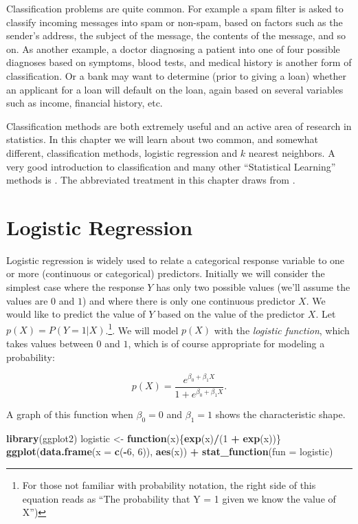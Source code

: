 \documentclass[
]{krantz}
\makeatletter
\newenvironment{Shaded}{\begin{snugshade}}{\end{snugshade}}
\newcommand{\ControlFlowTok}[1]{\textcolor[rgb]{0.27,0.27,0.27}{\textbf{#1}}}
\newcommand{\DataTypeTok}[1]{\textcolor[rgb]{0.27,0.27,0.27}{#1}}
\newcommand{\DecValTok}[1]{\textcolor[rgb]{0.06,0.06,0.06}{#1}}
\newcommand{\KeywordTok}[1]{\textcolor[rgb]{0.27,0.27,0.27}{\textbf{#1}}}
\newcommand{\NormalTok}[1]{#1}
\newcommand{\OperatorTok}[1]{\textcolor[rgb]{0.43,0.43,0.43}{\textbf{#1}}}
\newcommand{\StringTok}[1]{\textcolor[rgb]{0.5,0.5,0.5}{#1}}
\newenvironment{kframe}{%
\medskip{}
\setlength{\fboxsep}{.8em}
 \def\at@end@of@kframe{}%
 \ifinner\ifhmode%
  \def\at@end@of@kframe{\end{minipage}}%
  \begin{minipage}{\columnwidth}%
 \fi\fi%
 \def\FrameCommand##1{\hskip\@totalleftmargin \hskip-\fboxsep
 \colorbox{shadecolor}{##1}\hskip-\fboxsep
     \hskip-\linewidth \hskip-\@totalleftmargin \hskip\columnwidth}%
 \MakeFramed {\advance\hsize-\width
   \@totalleftmargin\z@ \linewidth\hsize
   \@setminipage}}%
 {\par\unskip\endMakeFramed%
 \at@end@of@kframe}
\renewenvironment{Shaded}{\begin{kframe}}{\end{kframe}}
\makeatother
\begin{document}
Classification problems are quite common. For example a spam filter is asked to classify incoming messages into spam or non-spam, based on factors such as the sender's address, the subject of the message, the contents of the message, and so on. As another example, a doctor diagnosing a patient into one of four possible diagnoses based on symptoms, blood tests, and medical history is another form of classification. Or a bank may want to determine (prior to giving a loan) whether an applicant for a loan will default on the loan, again based on several variables such as income, financial history, etc.

Classification methods are both extremely useful and an active area of research in statistics. In this chapter we will learn about two common, and somewhat different, classification methods, logistic regression and \(k\) nearest neighbors. A very good introduction to classification and many other ``Statistical Learning'' methods is \citet{JamesEtAl}. The abbreviated treatment in this chapter draws from \citet{JamesEtAl}.

\hypertarget{logistic-regression}{%
\section{Logistic Regression}\label{logistic-regression}}

Logistic regression is widely used to relate a categorical response variable to one or more (continuous or categorical) predictors. Initially we will consider the simplest case where the response \(Y\) has only two possible values (we'll assume the values are \(0\) and \(1\)) and where there is only one continuous predictor \(X\). We would like to predict the value of \(Y\) based on the value of the predictor \(X\). Let \(p(X) = P(Y = 1 | X)\).\footnote{For those not familiar with probability notation, the right side of this equation reads as ``The probability that Y = 1 given we know the value of X'')}. We will model \(p(X)\) with the \emph{logistic function}, which takes values between \(0\) and \(1\), which is of course appropriate for modeling a probability:

\[
p(X) = \frac{e^{\beta_0 + \beta_1 X}}{1 + e^{\beta_0 + \beta_1 X}}.
\]

A graph of this function when \(\beta_0=0\) and \(\beta_1 = 1\) shows the characteristic shape.

\begin{Shaded}
\begin{Highlighting}[]
\KeywordTok{library}\NormalTok{(ggplot2)}
\NormalTok{logistic \textless{}{-}}\StringTok{ }\ControlFlowTok{function}\NormalTok{(x)\{}\KeywordTok{exp}\NormalTok{(x)}\OperatorTok{/}\NormalTok{(}\DecValTok{1} \OperatorTok{+}\StringTok{ }\KeywordTok{exp}\NormalTok{(x))\}}
\KeywordTok{ggplot}\NormalTok{(}\KeywordTok{data.frame}\NormalTok{(}\DataTypeTok{x =} \KeywordTok{c}\NormalTok{(}\OperatorTok{{-}}\DecValTok{6}\NormalTok{, }\DecValTok{6}\NormalTok{)), }\KeywordTok{aes}\NormalTok{(x)) }\OperatorTok{+}
\StringTok{  }\KeywordTok{stat\_function}\NormalTok{(}\DataTypeTok{fun =}\NormalTok{ logistic)}
\end{Highlighting}
\end{Shaded}
\end{document}
